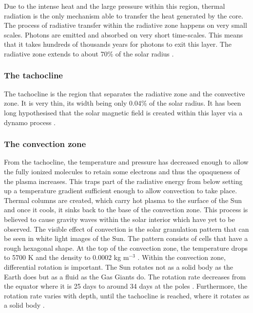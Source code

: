    Due to the intense heat and the large pressure within this region, thermal radiation is the only mechanism able to transfer the heat generated by the core.
    The process of radiative transfer within the radiative zone happens on very small scales.
    Photons are emitted and absorbed on very short time-scales. 
    This means that it takes hundreds of thousands years for photons to exit this layer.
    The radiative zone extends to about 70\% of the solar radius \citep{cox1991solar}. 
        
\subsubsection{The tachocline}

    The tachocline is the region that separates the radiative zone and the convective zone.
    It is very thin, its width being only 0.04\% of the solar radius.
    It has been long hypothesised that the solar magnetic field is created within this layer via a dynamo process \citep{stix2004sun,soward2005fluid}.

\subsubsection{The convection zone}

    From the tachocline, the temperature and pressure has decreased enough to allow the fully ionized molecules to retain some electrons and thus the opaqueness of the plasma increases.
    This traps part of the radiative energy from below setting up a temperature gradient sufficient enough to allow convection to take place.
    Thermal columns are created, which carry hot plasma to the surface of the Sun and once it cools, it sinks back to the base of the convection zone.
    This process is believed to cause gravity waves within the solar interior which have yet to be observed.
    The visible effect of convection is the solar granulation pattern that can be seen in white light images of the Sun.  
    The pattern consists of cells that have a rough hexagonal shape. 
    At the top of the convection zone, the temperature drops to 5700 K and the density to 0.0002 kg m$^{-3}$ \citep{gai2000sun}. 
    Within the convection zone, differential rotation is important.
    The Sun rotates not as a solid body as the Earth does but as a fluid as the Gas Giants do. 
    The rotation rate decreases from the equator where it is 25 days to around 34 days at the poles \citep{2000SoPh..191...47B}.
    Furthermore, the rotation rate varies with depth, until the tachocline is reached, where it rotates as a solid body \citep{Howe31032000}.
    
